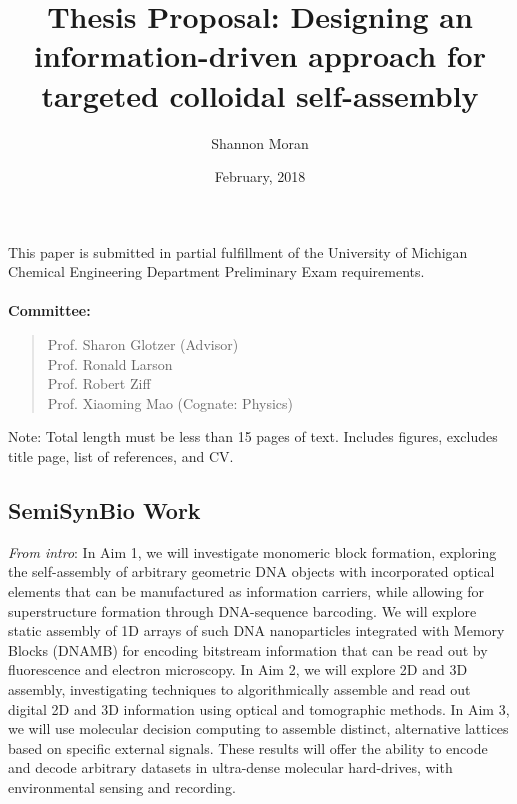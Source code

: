 \documentclass[12pt, oneside]{article}   	%
\title{Thesis Proposal: Designing an information-driven approach for targeted colloidal self-assembly}
\author{Shannon Moran}
\date{February, 2018}
\begin{document}
\maketitle
\thispagestyle{empty}
\noindent
This paper is submitted in partial fulfillment of the University of Michigan Chemical Engineering Department Preliminary Exam requirements.
\\ \\
\textbf{Committee:} 
\begin{quote} 
Prof. Sharon Glotzer (Advisor) \\ Prof. Ronald Larson \\ Prof. Robert Ziff \\ Prof. Xiaoming Mao (Cognate: Physics)
\end{quote}
\par
Note: Total length must be less than 15 pages of text. Includes figures, excludes title page, list of references, and CV.


\newpage
\thispagestyle{empty}
\tableofcontents
\newpage
\listoffigures


\newpage



\clearpage
\setcounter{page}{1}













\subsection{SemiSynBio Work}

\textit{From intro}:
In Aim 1, we will investigate monomeric block formation, exploring the self-assembly of arbitrary geometric DNA objects with incorporated optical elements that can be manufactured as information carriers, while allowing for superstructure formation through DNA-sequence barcoding. We will explore static assembly of 1D arrays of such DNA nanoparticles integrated with Memory Blocks (DNAMB) for encoding bitstream information that can be read out by fluorescence and electron microscopy. In Aim 2, we will explore 2D and 3D assembly, investigating techniques to algorithmically assemble and read out digital 2D and 3D information using optical and tomographic methods. In Aim 3, we will use molecular decision computing to assemble distinct, alternative lattices based on specific external signals. These results will offer the ability to encode and decode arbitrary datasets in ultra-dense molecular hard-drives, with environmental sensing and recording.
\end{document}
